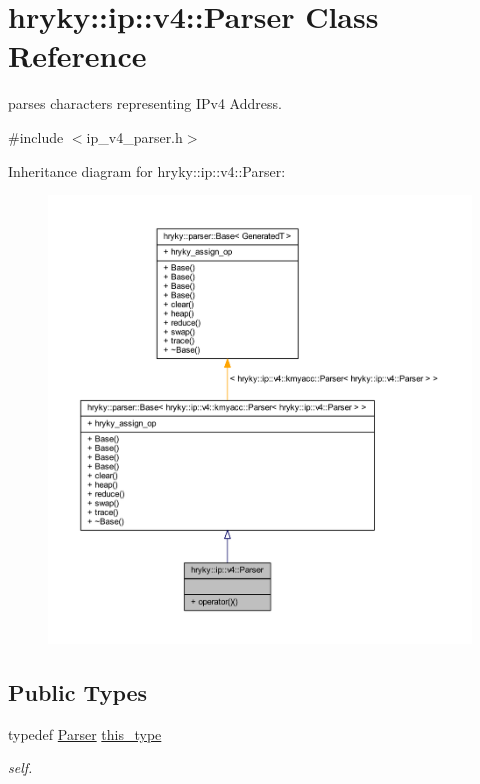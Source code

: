 \hypertarget{classhryky_1_1ip_1_1v4_1_1_parser}{\section{hryky\-:\-:ip\-:\-:v4\-:\-:Parser Class Reference}
\label{classhryky_1_1ip_1_1v4_1_1_parser}
}


parses characters representing I\-Pv4 Address.  




{\ttfamily \#include $<$ip\-\_\-v4\-\_\-parser.\-h$>$}



Inheritance diagram for hryky\-:\-:ip\-:\-:v4\-:\-:Parser\-:
\nopagebreak
\begin{figure}[H]
\begin{center}
\leavevmode
\includegraphics[width=350pt]{classhryky_1_1ip_1_1v4_1_1_parser__inherit__graph}
\end{center}
\end{figure}
\subsection*{Public Types}
\begin{DoxyCompactItemize}
\item 
\hypertarget{classhryky_1_1ip_1_1v4_1_1_parser_ab85551348aa8cf5c7da65859d0d0448f}{typedef \hyperlink{classhryky_1_1ip_1_1v4_1_1_parser}{Parser} \hyperlink{classhryky_1_1ip_1_1v4_1_1_parser_ab85551348aa8cf5c7da65859d0d0448f}{this\-\_\-type}}\label{classhryky_1_1ip_1_1v4_1_1_parser_ab85551348aa8cf5c7da65859d0d0448f}

\begin{DoxyCompactList}\small\item\em self. \end{DoxyCompactList}\end{DoxyCompactItemize}
